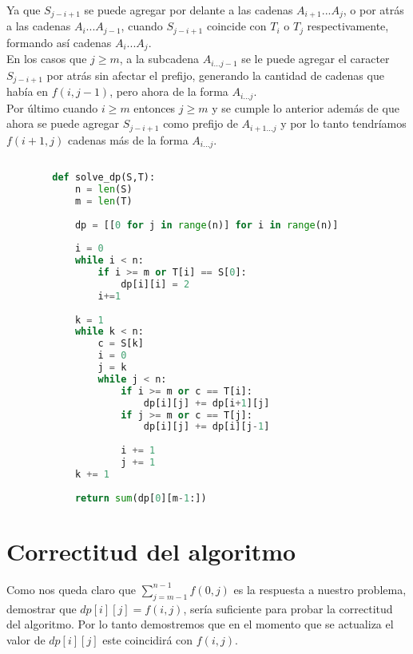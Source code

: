 \documentclass[a4paper]{article}
\begin{document}
    Ya que $S_{j-i+1}$ se puede agregar por delante a las cadenas $A_{i+1}...A_j$, o por atr\'as a las cadenas 
    $A_{i}...A_{j-1}$, cuando $S_{j-i+1}$ coincide con $T_i$ o $T_j$ respectivamente, formando as\'i cadenas $A_{i}...A_{j}$.\\

    En los casos que $j \geq m$, a la subcadena $A_{i...j-1}$ se le puede agregar el caracter $S_{j-i+1}$ por atr\'as sin afectar 
    el prefijo, generando la cantidad de cadenas que hab\'ia en $f(i,j-1)$, pero ahora de la forma $A_{i...j}$.\\
    
    Por \'ultimo cuando $i \geq m$ entonces $j \geq m$ y se cumple lo anterior adem\'as de que ahora se puede agregar $S_{j-i+1}$ como prefijo de 
    $A_{i+1...j}$ y por lo tanto tendr\'iamos $f(i+1,j)$ cadenas m\'as de la forma $A_{i...j}$.
    
    \begin{lstlisting}[language=Python]
    	
    	def solve_dp(S,T):
    	    n = len(S)
    	    m = len(T)
    	    
    	    dp = [[0 for j in range(n)] for i in range(n)]
    	    
    	    i = 0
    	    while i < n:
    	        if i >= m or T[i] == S[0]:
    	            dp[i][i] = 2
    	        i+=1    	        
    	    
    	    k = 1
    	    while k < n:
    	        c = S[k]    	        
    	        i = 0
    	        j = k
    	        while j < n:
    	            if i >= m or c == T[i]:
    	                dp[i][j] += dp[i+1][j]
    	            if j >= m or c == T[j]:
    	                dp[i][j] += dp[i][j-1]
                 
    	            i += 1
    	            j += 1
    	    k += 1
    	    
    	    return sum(dp[0][m-1:])
    \end{lstlisting}
	
	\section*{Correctitud del algoritmo}
	
	Como nos queda claro que $\sum_{j= m-1}^{n-1}f(0,j)$ es la respuesta a nuestro problema, demostrar que $dp[i][j] = f(i,j)$, sería suficiente para probar la correctitud del algoritmo. Por lo tanto demostremos que en el momento que se actualiza el valor de $dp[i][j]$ este coincidirá con $f(i,j)$.
	
\end{document}
